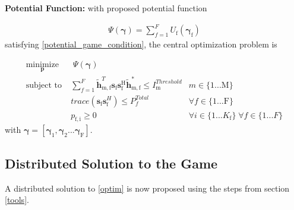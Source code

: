 \documentclass[12pt,a4paper]{report}
\begin{document}
\textbf{Potential Function:} with proposed potential function 

\begin{gather*} \label{Potential_Function}
\Psi(\mathbf{\gamma}) = \sum_{f = 1}^{F} U_{\text{f}}(\mathbf{\gamma_{\mathrm{f}}})
\end{gather*}
satisfying \eqref{potential_game_condition}, the central optimization problem is
	
		\begin{subequations}
	\label{optim}
	\begin{align}
	    \underset{\mathbf{p}}{\text{minimize}}
	    & \; \Psi(\mathbf{\gamma}) \label{potential_game} \\
	    \text{subject to} \; &
	  \sum^F_{f=1} \mathbf{\tilde{h}}_{\mathrm{m,f}}^T  \mathbf{s}_{\mathrm{f}} 						
	\mathbf{s_{\mathrm{f}}^{\mathrm{H}}} \mathbf{\tilde{h}_{\mathrm{m,f}}^*} \leq I^{Threshold}		
	_{\mathrm{m}} & m \in \{1 ...\text{M}\} 
		\label{interference_const}\\
        & trace(\mathbf{s}_\mathrm{f}\mathbf{s}_\mathrm{f}^H)  \leq P^{Total}_{f}  \label{power_const}
        & \forall f \in \{1 ... \text{F}\}\\
        & p_{\mathrm{f,i}} \geq 0 &  \forall i \in \{1 ...K_{\mathrm{f}}\} \; \forall f \in \{1 ... F\}\label{pos_power_const}
	\end{align}
	\end{subequations}
	with $\mathbf{\gamma}= [\mathbf{\gamma_{\mathrm{1}}},\mathbf{\gamma_{\mathrm{2}}}...\mathbf{\gamma_{\mathrm{F}}}]$.


\subsection{Distributed Solution to the Game}
A distributed solution to \eqref{optim} is now proposed using the steps from section \ref{tools}.
\end{document}
